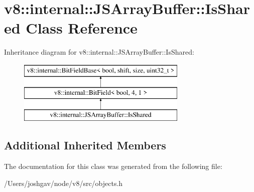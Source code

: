 \hypertarget{classv8_1_1internal_1_1_j_s_array_buffer_1_1_is_shared}{}\section{v8\+:\+:internal\+:\+:J\+S\+Array\+Buffer\+:\+:Is\+Shared Class Reference}
\label{classv8_1_1internal_1_1_j_s_array_buffer_1_1_is_shared}
Inheritance diagram for v8\+:\+:internal\+:\+:J\+S\+Array\+Buffer\+:\+:Is\+Shared\+:\begin{figure}[H]
\begin{center}
\leavevmode
\includegraphics[height=3.000000cm]{classv8_1_1internal_1_1_j_s_array_buffer_1_1_is_shared}
\end{center}
\end{figure}
\subsection*{Additional Inherited Members}


The documentation for this class was generated from the following file\+:\begin{DoxyCompactItemize}
\item 
/\+Users/joshgav/node/v8/src/objects.\+h\end{DoxyCompactItemize}
